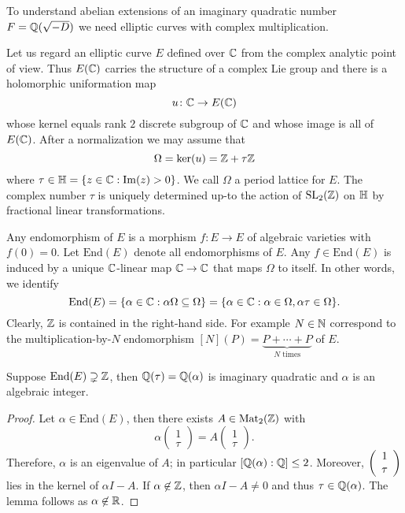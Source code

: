 To understand abelian extensions of an imaginary quadratic number
$F={\mathbb{Q}}(\sqrt{-D})$ we need elliptic curves with complex
multiplication.

Let us regard an elliptic curve $E$ defined over ${\mathbb{C}}$ from the
complex analytic point of view. Thus $E({\mathbb{C}})$ carries the structure of
a complex Lie group and there is a holomorphic uniformation map
\begin{equation*}
  u \colon {\mathbb{C}} \rightarrow E({\mathbb{C}})
\end{equation*}
whose kernel equals rank $2$ discrete subgroup of ${\mathbb{C}}$ and whose
image is all of $E({\mathbb{C}})$. After a normalization we may assume that
\begin{equation*}
  \Omega = \mathrm{ker}(u) = {\mathbb{Z}}+\tau{\mathbb{Z}}
\end{equation*}
where $\tau\in {\mathbb{H}} = \{z\in {\mathbb{C}} : \mathrm{Im}(z)>0\}$. We call
$\Omega$ a period lattice for $E$. The complex number $\tau$ is
uniquely determined up-to the action of $\mathrm{SL}_2({\mathbb{Z}})$ on ${\mathbb{H}}$
by fractional linear transformations. 

Any endomorphism of $E$ is a morphism $f\colon E\rightarrow E$ of
algebraic varieties with $f(0)=0$. Let $\mathrm{End}(E)$ denote all
endomorphisms of $E$. Any $f\in \mathrm{End}(E)$ is
induced by a unique ${\mathbb{C}}$-linear map
${\mathbb{C}}\rightarrow {\mathbb{C}}$ that maps $\Omega$ to itself. In other words, we
identify
\begin{equation*}
  \mathrm{End}(E) = \{ \alpha\in{\mathbb{C}} : \alpha \Omega \subseteq \Omega \}
  = \{\alpha\in {\mathbb{C}} : \alpha\in \Omega, \alpha\tau\in \Omega\}. 
\end{equation*}
Clearly,  ${\mathbb{Z}}$ is contained in the right-hand side. For example  $N\in{\mathbb{N}}$
correspond to the multiplication-by-$N$ endomorphism $[N](P) =
\underbrace{P+\cdots +P}_{N\text{ times}}$ of $E$.

\begin{lemma}
  Suppose $\mathrm{End}(E) \supsetneq {\mathbb{Z}}$, then
  ${\mathbb{Q}}(\tau)={\mathbb{Q}}(\alpha)$
  is imaginary
  quadratic and $\alpha$ is an algebraic integer. 
\end{lemma}
\begin{proof}
  Let $\alpha\in \mathrm{End}(E)$, then there exists $A\in\mathrm{Mat}_2({\mathbb{Z}})$ with
  \begin{equation*}
    \alpha \left(
      \begin{array}{c}
        1 \\ \tau 
      \end{array}
    \right) = %
    A\left(
      \begin{array}{c}
        1 \\ \tau 
      \end{array}
    \right).
  \end{equation*}
  Therefore, $\alpha$ is an eigenvalue of $A$; in particular
  $[{\mathbb{Q}}(\alpha):{\mathbb{Q}}]\le 2$. Moreover, $\left( \begin{array}{c} {1} \\ {\tau} \end{array} \right)$ lies in the
  kernel of $\alpha I-A$. If $\alpha\not\in {\mathbb{Z}}$, then $\alpha
  I-A\not=0$ and thus $\tau \in {\mathbb{Q}}(\alpha)$. The lemma follows as
  $\alpha\not\in{\mathbb{R}}$. 
\end{proof}

